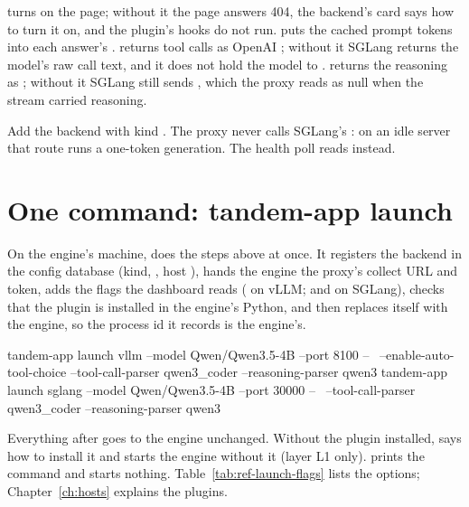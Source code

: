  turns on the  page; without it the page answers 404, the backend's card says how to turn it on, and the plugin's hooks do not run.  puts the cached prompt tokens into each answer's .  returns tool calls as OpenAI ; without it SGLang returns the model's raw call text, and it does not hold the model to .  returns the reasoning as ; without it SGLang still sends , which the proxy reads as null when the stream carried reasoning.

Add the backend with kind . The proxy never calls SGLang's : on an idle server that route runs a one-token generation. The health poll reads  instead.

\section{One command: tandem-app launch}\label{sec:launch}

On the engine's machine,  does the steps above at once. It registers the backend in the config database (kind, , host ), hands the engine the proxy's collect URL and token, adds the flags the dashboard reads ( on vLLM;  and  on SGLang), checks that the plugin is installed in the engine's Python, and then replaces itself with the engine, so the process id it records is the engine's.

\begin{shell}
tandem-app launch vllm --model Qwen/Qwen3.5-4B --port 8100 -- \
    --enable-auto-tool-choice --tool-call-parser qwen3_coder --reasoning-parser qwen3
tandem-app launch sglang --model Qwen/Qwen3.5-4B --port 30000 -- \
    --tool-call-parser qwen3_coder --reasoning-parser qwen3
\end{shell}

Everything after \code{--} goes to the engine unchanged. Without the plugin installed,  says how to install it and starts the engine without it (layer L1 only).  prints the command and starts nothing. Table~\ref{tab:ref-launch-flags} lists the options; Chapter~\ref{ch:hosts} explains the plugins.

